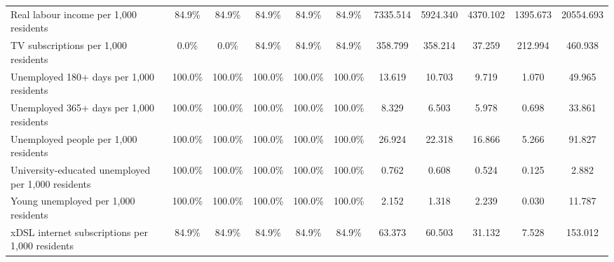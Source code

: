 \begin{table}
{\begin{tabular}{lcccccccccc}
Real labour income per 1,000 residents & 84.9\% & 84.9\% & 84.9\% & 84.9\% & 84.9\% & 7335.514 & 5924.340 & 4370.102 & 1395.673 & 20554.693 \\
TV subscriptions per 1,000 residents & 0.0\% & 0.0\% & 84.9\% & 84.9\% & 84.9\% & 358.799 & 358.214 & 37.259 & 212.994 & 460.938 \\
Unemployed 180+ days per 1,000 residents & 100.0\% & 100.0\% & 100.0\% & 100.0\% & 100.0\% & 13.619 & 10.703 & 9.719 & 1.070 & 49.965 \\
Unemployed 365+ days per 1,000 residents & 100.0\% & 100.0\% & 100.0\% & 100.0\% & 100.0\% & 8.329 & 6.503 & 5.978 & 0.698 & 33.861 \\
Unemployed people per 1,000 residents & 100.0\% & 100.0\% & 100.0\% & 100.0\% & 100.0\% & 26.924 & 22.318 & 16.866 & 5.266 & 91.827 \\
University-educated unemployed per 1,000 residents & 100.0\% & 100.0\% & 100.0\% & 100.0\% & 100.0\% & 0.762 & 0.608 & 0.524 & 0.125 & 2.882 \\
Young unemployed per 1,000 residents & 100.0\% & 100.0\% & 100.0\% & 100.0\% & 100.0\% & 2.152 & 1.318 & 2.239 & 0.030 & 11.787 \\
xDSL internet subscriptions per 1,000 residents & 84.9\% & 84.9\% & 84.9\% & 84.9\% & 84.9\% & 63.373 & 60.503 & 31.132 & 7.528 & 153.012 \\
\bottomrule
\end{tabular}%
}
\end{table}
